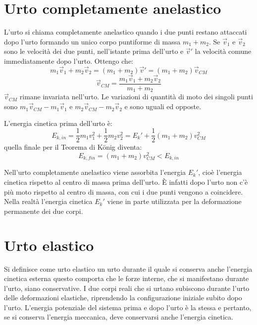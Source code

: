 \documentclass[class=book, crop=false, oneside, 12pt]{standalone}
\begin{document}
\section{Urto completamente anelastico}

L'urto si chiama completamente anelastico quando i due punti restano attaccati dopo l'urto formando un unico corpo puntiforme di massa \(m_1 + m_2\).
Se \(\overrightarrow{v}_1\) e \(\overrightarrow{v}_2\) sono le velocità dei due punti, nell'istante prima dell'urto e \(\overrightarrow{v}'\) la velocità comune immediatamente dopo l'urto.
Ottengo che:
\begin{equation*}
    m_1 \overrightarrow{v}_1 + m_2 \overrightarrow{v}_2 = \left( m_1 + m_2 \right) \overrightarrow{v}' = \left( m_1 + m_2 \right) \overrightarrow{v}_{CM}
\end{equation*} 
\begin{equation*}
    \overrightarrow{v}_{CM} = \frac{m_1 \overrightarrow{v}_1 + m_2 \overrightarrow{v}_2}{m_1 + m_2}
\end{equation*}
\(\overrightarrow{v}_{CM}\) rimane invariata nell'urto. Le variazioni di quantità di moto dei singoli punti sono \(m_1 \overrightarrow{v}_{CM} - m_1 \overrightarrow{v}_{1}\) e \(m_2 \overrightarrow{v}_{CM} - m_2 \overrightarrow{v}_{2}\) e sono uguali ed opposte.

L'energia cinetica prima dell'urto è:
\begin{equation*}
    E_{k,in} = \frac{1}{2} m_1 v_1^2 + \frac{1}{2} m_2 v_2^2 = E_k' + \frac{1}{2} \left( m_1 + m_2 \right) v_{CM}^2
\end{equation*}
quella finale per il Teorema di König diventa: %
\begin{equation*}
    E_{k,fin} = \left( m_1 + m_2 \right) v_{CM}^2 < E_{k,in}
\end{equation*}

Nell'urto completamente anelastico viene assorbita l'energia \(E_k'\), cioè l'energia cinetica rispetto al centro di massa prima dell'urto. 
È infatti dopo l'urto non c'è più moto rispetto al centro di massa, con cui i due punti vengono a  coincidere. 
Nella realtà l'energia cinetica \(E_k'\) viene in parte utilizzata per la deformazione permanente dei due corpi. 

\section{Urto elastico}

Si definisce come urto elastico un urto durante il quale si conserva anche l'energia cinetica esterna questo comporta che le forze interne, che si manifestano durante l'urto, siano conservative. 
I due corpi reali che si urtano subiscono durante l'urto delle deformazioni elastiche, riprendendo la configurazione iniziale subito dopo l'urto.
L'energia potenziale del sistema prima e dopo l'urto è la stessa e pertanto, se si conserva l'energia meccanica, deve conservarsi anche l'energia cinetica.
\end{document}
